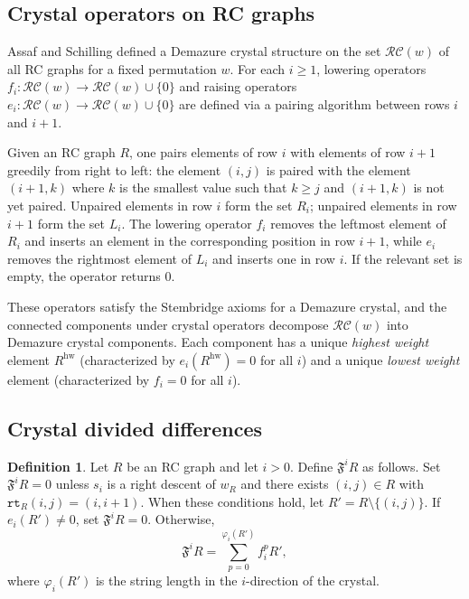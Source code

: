 \documentclass{amsart}
\theoremstyle{definition}
\newtheorem{definition}[lemma]{Definition}
\theoremstyle{remark}
\numberwithin{equation}{section}
\newcommand{\RC}{\mathcal{RC}}
\newcommand{\wof}[1]{w_{#1}}
\newcommand{\rcdd}{\mathfrak{F}}
\begin{document}
\subsection{Crystal operators on RC graphs}

Assaf and Schilling defined a Demazure crystal structure on the set $\RC(w)$ of all RC graphs for a fixed permutation $w$.  For each $i \geq 1$, lowering operators $f_i : \RC(w) \to \RC(w) \cup \{0\}$ and raising operators $e_i : \RC(w) \to \RC(w) \cup \{0\}$ are defined via a pairing algorithm between rows $i$ and $i+1$.

Given an RC graph $R$, one pairs elements of row $i$ with elements of row $i+1$ greedily from right to left: the element $(i, j)$ is paired with the element $(i+1, k)$ where $k$ is the smallest value such that $k \geq j$ and $(i+1, k)$ is not yet paired.  Unpaired elements in row $i$ form the set $R_i$; unpaired elements in row $i+1$ form the set $L_i$.  The lowering operator $f_i$ removes the leftmost element of $R_i$ and inserts an element in the corresponding position in row $i+1$, while $e_i$ removes the rightmost element of $L_i$ and inserts one in row $i$.  If the relevant set is empty, the operator returns $0$.

These operators satisfy the Stembridge axioms for a Demazure crystal, and the connected components under crystal operators decompose $\RC(w)$ into Demazure crystal components.  Each component has a unique \textit{highest weight} element $R^{\mathrm{hw}}$ (characterized by $e_i(R^{\mathrm{hw}}) = 0$ for all $i$) and a unique \textit{lowest weight} element (characterized by $f_i = 0$ for all $i$).

\subsection{Crystal divided differences}

\begin{definition}\label{definition:crystaldivdiff}
Let $R$ be an RC graph and let $i > 0$.  Define $\rcdd^i R$ as follows.  Set $\rcdd^i R = 0$ unless $s_i$ is a right descent of $\wof{R}$ and there exists $(i, j) \in R$ with $\mathtt{rt}_R(i, j) = (i, i+1)$.  When these conditions hold, let $R' = R \setminus \{(i, j)\}$.  If $e_i(R') \neq 0$, set $\rcdd^i R = 0$.  Otherwise,
\[
\rcdd^i R = \sum_{p=0}^{\varphi_i(R')} f_i^p R',
\]
where $\varphi_i(R')$ is the string length in the $i$-direction of the crystal.
\end{definition}
\end{document}
